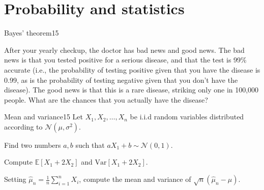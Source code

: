\documentclass{article}
\begin{document}




\section{Probability and statistics}

\begin{problem}{Bayes’ theorem}{15}


	After your yearly checkup, the doctor has bad news and good news. 
    The bad news is that you tested positive for a serious disease, and that the test is 99\% accurate (i.e., the probability of testing positive given that you have the disease is 0.99, as is the probability of testing negative given that you don't have the disease).
    The good news is that this is a rare disease, striking only one in 100,000 people.
    What are the chances that you actually have the disease?


\solution{

}


\end{problem}

\begin{problem}{Mean and variance}{15}
 Let $X_1, X_2, \ldots, X_n $ be i.i.d random variables distributed according to $\mathcal{N}(\mu, \sigma^2)$. 
 
  Find two numbers $a,b$ such that $aX_1+b \sim \mathcal{N}(0,1)$. 
 
  Compute $\mathbb{E}[X_1 + 2X_2]$ and $\mathrm{Var}[X_1 + 2X_2]$. 
 
  Setting $\widehat{\mu}_n = \frac{1}{n} \sum_{i=1}^n X_i$, compute the mean and variance of $\sqrt{n}(\widehat{\mu}_n - \mu)$. \\
 

\end{problem}
\end{document}
